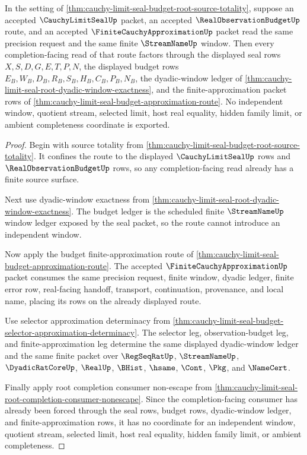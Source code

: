 \begin{theorem}
\label{thm:cauchy-limit-seal-budget-finite-approximation-window-exhaustion}
In the setting of \autoref{thm:cauchy-limit-seal-budget-root-source-totality}, suppose an accepted $\CauchyLimitSealUp$ packet, an accepted $\RealObservationBudgetUp$ route, and an accepted $\FiniteCauchyApproximationUp$ packet read the same precision request and the same finite $\StreamNameUp$ window. Then every completion-facing read of that route factors through the displayed seal rows $X,S,D,G,E,T,P,N$, the displayed budget rows $E_B,W_B,D_B,R_B,S_B,H_B,C_B,P_B,N_B$, the dyadic-window ledger of \autoref{thm:cauchy-limit-seal-root-dyadic-window-exactness}, and the finite-approximation packet rows of \autoref{thm:cauchy-limit-seal-budget-approximation-route}. No independent window, quotient stream, selected limit, host real equality, hidden family limit, or ambient completeness coordinate is exported.
\end{theorem}
\begin{proof}
Begin with source totality from \autoref{thm:cauchy-limit-seal-budget-root-source-totality}. It confines the route to the displayed $\CauchyLimitSealUp$ rows and $\RealObservationBudgetUp$ rows, so any completion-facing read already has a finite source surface.

Next use dyadic-window exactness from \autoref{thm:cauchy-limit-seal-root-dyadic-window-exactness}. The budget ledger is the scheduled finite $\StreamNameUp$ window ledger exposed by the seal packet, so the route cannot introduce an independent window.

Now apply the budget finite-approximation route of \autoref{thm:cauchy-limit-seal-budget-approximation-route}. The accepted $\FiniteCauchyApproximationUp$ packet consumes the same precision request, finite window, dyadic ledger, finite error row, real-facing handoff, transport, continuation, provenance, and local name, placing its rows on the already displayed route.

Use selector approximation determinacy from \autoref{thm:cauchy-limit-seal-budget-selector-approximation-determinacy}. The selector leg, observation-budget leg, and finite-approximation leg determine the same displayed dyadic-window ledger and the same finite packet over $\RegSeqRatUp$, $\StreamNameUp$, $\DyadicRatCoreUp$, $\RealUp$, $\BHist$, $\hsame$, $\Cont$, $\Pkg$, and $\NameCert$.

Finally apply root completion consumer non-escape from \autoref{thm:cauchy-limit-seal-root-completion-consumer-nonescape}. Since the completion-facing consumer has already been forced through the seal rows, budget rows, dyadic-window ledger, and finite-approximation rows, it has no coordinate for an independent window, quotient stream, selected limit, host real equality, hidden family limit, or ambient completeness.
\end{proof}


